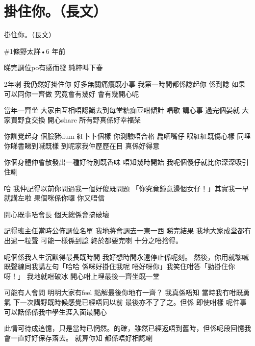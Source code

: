 \chapter{掛住你。（長文）}

掛住你。（長文）

\#1條野太詳•6 年前

睇完調位po有感而發 純粹叫下春

2年喇 我仍然好掛住你 好多無關痛癢既小事 我第一時間都係諗起你 係到諗 如果可以同你一齊做 究竟會有幾好 會有幾開心呢

當年一齊坐 大家由互相唔認識去到每堂糖痴豆咁傾計 唱歌 講心事 過完個晏就 大家買野食交換 開心share 所有野真係好幸福架

你訓覺起身 個臉豬dum 紅卜卜個樣 你測驗唔合格 扁哂嘴仔 眼紅紅既傷心樣 同埋你睇書睇到喊既樣 到呢家我仲歷歷在目 真係好得意

你個身體仲會散發出一種好特別既香味 唔知幾時開始 我呢個傻仔就比你深深吸引住喇

哈 我仲記得以前你問過我一個好傻既問題 「你究竟鐘意邊個女仔！」其實我一早就講左啦 果個咪係你囉 你又唔信

開心既事唔會長 個天總係會搞破壞

記得班主任當時公佈調位名單 我地將會調去一東一西 睇完結果 我地大家成堂都冇出過一粒聲 可能一樣係到諗 終於都要完喇 十分之唔捨得。

呢個係我人生沉默得最長既時間 我好想時間永遠停止係呢刻。 然後，你用就黎喊既聲線同我講左句「哈哈 係咪好掛住我呢 唔好呀你」我笑住咁答「勁掛住你呀！」  我地就咁破冰 開心咁上埋最後一齊坐既一堂

可能有人會問 明明大家有feel 點解最後你地冇一齊？ 我真係唔知 當時我冇咁既勇氣 下一次講野既時候感覺已經唔同以前 最後亦不了了之。但係 即使咁樣 呢件事可以話係係我中學生涯入面最開心

此情可待成追憶，只是當時已惘然。的確，雖然已經返唔到舊時，但係呢段回憶我會一直好好保存落去。 就算你知 都係唔好相認喇

